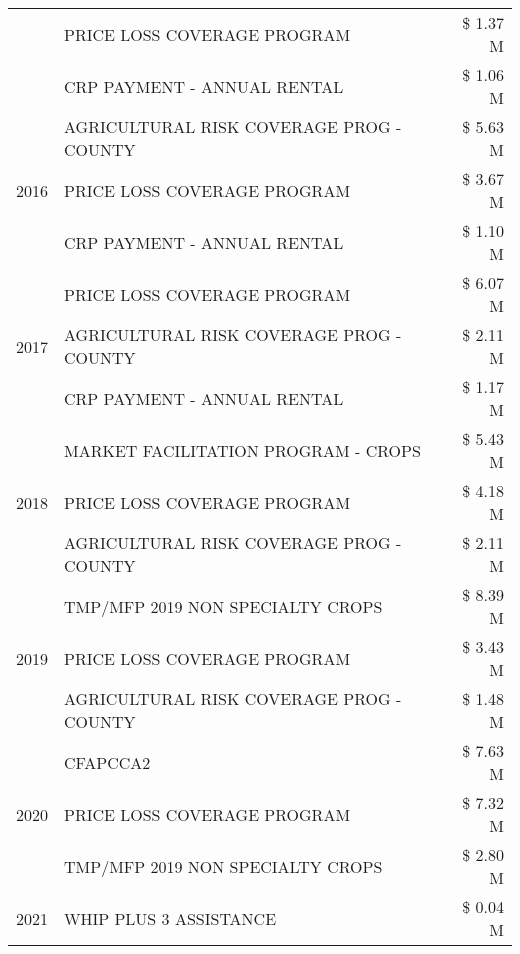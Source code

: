 \begin{tabular}{llr}
 & PRICE LOSS COVERAGE PROGRAM & \$ 1.37 M \\
 & CRP PAYMENT - ANNUAL RENTAL & \$ 1.06 M \\
\cline{1-3}
\multirow[t]{3}{*}{2016} & AGRICULTURAL RISK COVERAGE PROG - COUNTY & \$ 5.63 M \\
 & PRICE LOSS COVERAGE PROGRAM & \$ 3.67 M \\
 & CRP PAYMENT - ANNUAL RENTAL & \$ 1.10 M \\
\cline{1-3}
\multirow[t]{3}{*}{2017} & PRICE LOSS COVERAGE PROGRAM & \$ 6.07 M \\
 & AGRICULTURAL RISK COVERAGE PROG - COUNTY & \$ 2.11 M \\
 & CRP PAYMENT - ANNUAL RENTAL & \$ 1.17 M \\
\cline{1-3}
\multirow[t]{3}{*}{2018} & MARKET FACILITATION PROGRAM - CROPS & \$ 5.43 M \\
 & PRICE LOSS COVERAGE PROGRAM & \$ 4.18 M \\
 & AGRICULTURAL RISK COVERAGE PROG - COUNTY & \$ 2.11 M \\
\cline{1-3}
\multirow[t]{3}{*}{2019} & TMP/MFP 2019 NON SPECIALTY CROPS & \$ 8.39 M \\
 & PRICE LOSS COVERAGE PROGRAM & \$ 3.43 M \\
 & AGRICULTURAL RISK COVERAGE PROG - COUNTY & \$ 1.48 M \\
\cline{1-3}
\multirow[t]{3}{*}{2020} & CFAPCCA2 & \$ 7.63 M \\
 & PRICE LOSS COVERAGE PROGRAM & \$ 7.32 M \\
 & TMP/MFP 2019 NON SPECIALTY CROPS & \$ 2.80 M \\
\cline{1-3}
2021 & WHIP PLUS 3 ASSISTANCE & \$ 0.04 M \\
\cline{1-3}
\bottomrule
\end{tabular}
